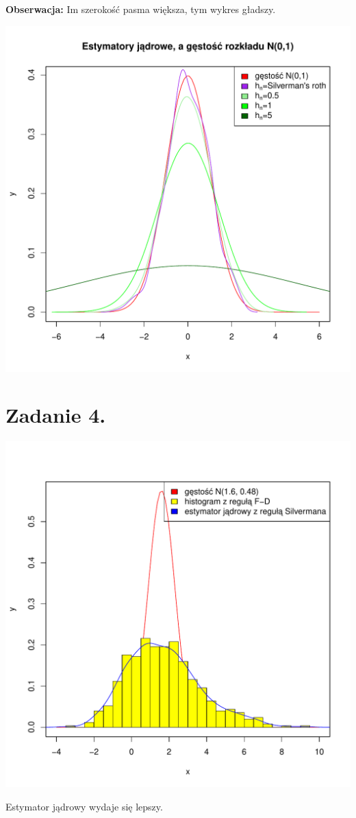 \documentclass[12pt, a4paper]{article}\usepackage[]{graphicx}\usepackage[]{xcolor}
\makeatletter
\def\maxwidth{ %
  \ifdim\Gin@nat@width>\linewidth
    \linewidth
  \else
    \Gin@nat@width
  \fi
}
\newenvironment{knitrout}{}{} %
\makeatother
\begin{document}
\textbf{Obserwacja:}
Im szerokość pasma większa, tym wykres gładszy.
\begin{knitrout}
\color{fgcolor}

{\centering \includegraphics[width=\maxwidth]{figure/unnamed-chunk-6-1} 

}


\end{knitrout}

\newpage
\section{Zadanie 4.}
\begin{knitrout}
\color{fgcolor}

{\centering \includegraphics[width=\maxwidth]{figure/unnamed-chunk-7-1} 

}


\end{knitrout}

Estymator jądrowy wydaje się lepszy.
\end{document}
